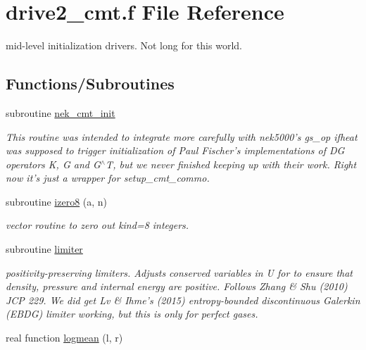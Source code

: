 \hypertarget{drive2__cmt_8f}{\section{drive2\-\_\-cmt.\-f File Reference}
\label{drive2__cmt_8f}
}


mid-\/level initialization drivers. Not long for this world.  


\subsection*{Functions/\-Subroutines}
\begin{DoxyCompactItemize}
\item 
\hypertarget{drive2__cmt_8f_a61e619e5f36fba502299223ac6513879}{subroutine \hyperlink{drive2__cmt_8f_a61e619e5f36fba502299223ac6513879}{nek\-\_\-cmt\-\_\-init}}\label{drive2__cmt_8f_a61e619e5f36fba502299223ac6513879}

\begin{DoxyCompactList}\small\item\em This routine was intended to integrate more carefully with nek5000's gs\-\_\-op ifheat was supposed to trigger initialization of Paul Fischer's implementations of D\-G operators K, G and G$^\wedge$\-T, but we never finished keeping up with their work. Right now it's just a wrapper for setup\-\_\-cmt\-\_\-commo. \end{DoxyCompactList}\item 
\hypertarget{drive2__cmt_8f_ae598a12ef00f223232ba04a1e871a924}{subroutine \hyperlink{drive2__cmt_8f_ae598a12ef00f223232ba04a1e871a924}{izero8} (a, n)}\label{drive2__cmt_8f_ae598a12ef00f223232ba04a1e871a924}

\begin{DoxyCompactList}\small\item\em vector routine to zero out kind=8 integers. \end{DoxyCompactList}\item 
\hypertarget{drive2__cmt_8f_a81da0b48bc01bfd806b0a9dfe517578f}{subroutine \hyperlink{drive2__cmt_8f_a81da0b48bc01bfd806b0a9dfe517578f}{limiter}}\label{drive2__cmt_8f_a81da0b48bc01bfd806b0a9dfe517578f}

\begin{DoxyCompactList}\small\item\em positivity-\/preserving limiters. Adjusts conserved variables in U for to ensure that density, pressure and internal energy are positive. Follows Zhang \& Shu (2010) J\-C\-P 229. We did get Lv \& Ihme's (2015) entropy-\/bounded discontinuous Galerkin (E\-B\-D\-G) limiter working, but this is only for perfect gases. \end{DoxyCompactList}\item 
\hypertarget{drive2__cmt_8f_a91f186bf1b4c97f611386abe42e5e547}{real function \hyperlink{drive2__cmt_8f_a91f186bf1b4c97f611386abe42e5e547}{logmean} (l, r)}\label{drive2__cmt_8f_a91f186bf1b4c97f611386abe42e5e547}


\end{DoxyCompactItemize}
